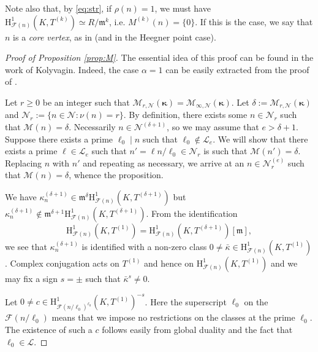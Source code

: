 \documentclass[10pt,reqno]{amsart}
\numberwithin{equation}{section}
\theoremstyle{plain}
\theoremstyle{definition}
\theoremstyle{definition}
\theoremstyle{plain}
\theoremstyle{plain}
\theoremstyle{plain}
\theoremstyle{plain}
\theoremstyle{plain}
\theoremstyle{plain}
\newcommand{\cF}{\mathcal{F}}
\newcommand{\CF}{\mathcal{F}}
\newcommand{\cL}{\mathcal{L}}
\newcommand{\cN}{\mathcal{N}}
\newcommand{\kap}{\kappa}
\newcommand{\fm}{\mathfrak{m}}
\newcommand{\rH}{\mathrm{H}}
\begin{document}
Note also that, by \eqref{eq:str}, if $\rho(n)=1$, we must have $\rH^1_{\CF(n)}(K,T^{(k)}) \simeq R/\fm^k$, i.e. $M^{(k)}(n)=\{0\}$. If this is the case, we say that $n$ is a \emph{core vertex}, as in \cite[Def. 4.1.8]{mazrub} (and \cite{zanarella} in the Heegner point case).

\begin{proof}[Proof of Proposition \ref{prop:M}]
The essential  idea of this proof can be found in the work of Kolyvagin. Indeed, the case $\alpha =1$ can be easily extracted from the proof of \cite[Prop.~5.2]{McCallum}.

Let $r\geq 0$ be an integer such that $\mathscr{M}_{r,\cN}(\boldsymbol{\kappa})= \mathscr{M}_{\infty,\cN}(\boldsymbol{\kappa})$.
Let $\delta:= \mathscr{M}_{r,\cN}(\boldsymbol{\kappa})$ and $\cN_r :=\{n\in \cN: \nu(n)=r\}$. By definition, there exists some $n\in \cN_r$ such that $\mathscr{M}(n) =\delta$. Necessarily $n \in \cN^{(\delta+1)}$, 
so we may assume that 
$e > \delta+1$.  Suppose there exists a prime $\ell_0\mid n$ such that $\ell_0\not\in \mathcal{L}_e$. We will show that there exists a prime 
$\ell\in \mathcal{L}_e$ such that
$n' = \ell n/\ell_0 \in \cN_r$ is such that $\mathscr{M}(n') = \delta$. Replacing $n$ with $n'$ and repeating as necessary, we arrive at an $n\in \cN_r^{(e)}$ such that $\mathscr{M}(n) =\delta$, whence the proposition. 

We have $\kap^{(\delta+1)}_n\in \fm^{\delta}\rH^1_{\cF(n)}(K,T^{(\delta+1)})$ but $\kap^{(\delta+1)}_n \not\in \fm^{\delta+1}\rH^1_{\cF(n)}(K,T^{(\delta+1)})$.
From the identification $$\rH^1_{\cF(n)}(K,T^{(1)}) = \rH^1_{\cF(n)}(K,T^{(\delta+1)})[\fm],$$ we see that $\kap^{(\delta+1)}_n$ is identified with a non-zero 
class $0\neq \bar\kap \in \rH^1_{\cF(n)}(K,T^{(1)})$. Complex conjugation acts on $T^{(1)}$ and hence on $\rH^1_{\cF(n)}(K,T^{(1)})$ and we may fix
a sign $s = \pm$ such that $\bar\kap^s\neq 0$.

Let $0\neq c \in \rH^1_{\cF(n/\ell_0)^{\ell_0}}(K,T^{(1)})^{-s}$. Here the superscript $\ell_0$ on the $\cF(n/\ell_0)$ means that we impose no restrictions on the classes at the prime $\ell_0$. The existence of such a $c$ follows easily from global duality and the fact that $\ell_0 \in \cL$. 


\end{proof}
\end{document}
